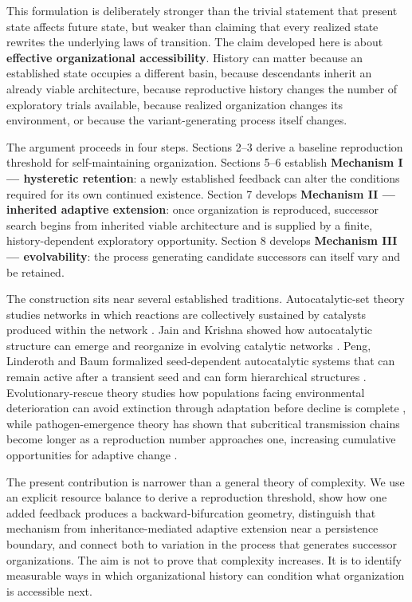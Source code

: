 \documentclass[11pt,a4paper]{article}
\begin{document}
This formulation is deliberately stronger than the trivial statement
that present state affects future state, but weaker than claiming that
every realized state rewrites the underlying laws of transition. The
claim developed here is about \textbf{effective organizational
accessibility}. History can matter because an established state occupies
a different basin, because descendants inherit an already viable
architecture, because reproductive history changes the number of
exploratory trials available, because realized organization changes its
environment, or because the variant-generating process itself changes.

The argument proceeds in four steps. Sections 2--3 derive a baseline
reproduction threshold for self-maintaining organization. Sections 5--6
establish \textbf{Mechanism I --- hysteretic retention}: a newly
established feedback can alter the conditions required for its own
continued existence. Section 7 develops \textbf{Mechanism II ---
inherited adaptive extension}: once organization is reproduced,
successor search begins from inherited viable architecture and is
supplied by a finite, history-dependent exploratory opportunity. Section
8 develops \textbf{Mechanism III --- evolvability}: the process
generating candidate successors can itself vary and be retained.

The construction sits near several established traditions.
Autocatalytic-set theory studies networks in which reactions are
collectively sustained by catalysts produced within the network
\citep{Hordijk2010, Hordijk2012}. Jain and Krishna showed how
autocatalytic structure can emerge and reorganize in evolving catalytic
networks \citep{Jain1998, Jain2001}. Peng, Linderoth and Baum formalized
seed-dependent autocatalytic systems that can remain active after a
transient seed and can form hierarchical structures \citep{Peng2022}.
Evolutionary-rescue theory studies how populations facing environmental
deterioration can avoid extinction through adaptation before decline is
complete \citep{Bell2017, Ferriere2013}, while pathogen-emergence theory
has shown that subcritical transmission chains become longer as a
reproduction number approaches one, increasing cumulative opportunities
for adaptive change \citep{Antia2003, Woolhouse2005}.

The present contribution is narrower than a general theory of
complexity. We use an explicit resource balance to derive a reproduction
threshold, show how one added feedback produces a backward-bifurcation
geometry, distinguish that mechanism from inheritance-mediated adaptive
extension near a persistence boundary, and connect both to variation in
the process that generates successor organizations. The aim is not to
prove that complexity increases. It is to identify measurable ways in
which organizational history can condition what organization is
accessible next.
\end{document}
